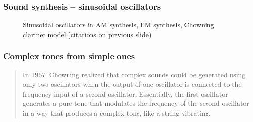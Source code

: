 \documentclass{beamer}
\begin{document}
\begin{frame}
\frametitle{Sound synthesis -- sinusoidal oscillators}
	\begin{figure}
		\hspace{0.2em}
		\hspace{0.2em}
		\caption{Sinusoidal oscillators in AM synthesis, FM synthesis, Chowning clarinet model (citations on previous slide)}
	\end{figure}
\end{frame}

\begin{frame}
	\frametitle{Complex tones from simple ones}
	\begin{quote}
		 In 1967, Chowning realized that complex sounds could be generated using only two oscillators when the output of one oscillator is connected to the frequency input of a second oscillator. Essentially, the first oscillator generates a pure tone that modulates the frequency of the second oscillator in a way that produces a complex tone, like a string vibrating.
	\end{quote}
\end{frame}
\end{document}
